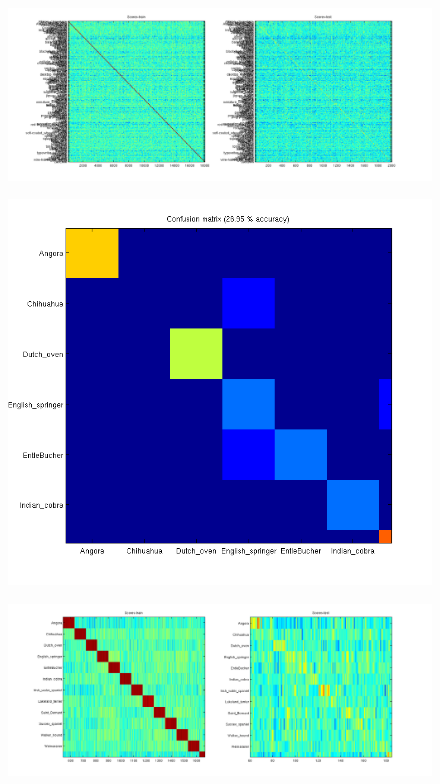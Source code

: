 \documentclass[10pt,two column,letter paper]{article}
\begin{document}
\begin{figure}[t]
\begin{center}
\includegraphics[width=0.9\linewidth]{m1-2_imagenet_tiny.png}
\end{center}
   \caption{}
\label{fig:m1-2_imagenet_tiny}
\end{figure}

\begin{figure}[t]
\begin{center}
\includegraphics[width=0.9\linewidth]{m1_imagenet_tiny_chihuahua-1.png}
\end{center}
   \caption{}
\label{fig:m1_imagenet_tiny_chihuahua_1}
\end{figure}

\begin{figure}[t]
\begin{center}
\includegraphics[width=0.9\linewidth]{m1_imagenet_tiny_chihuahua-2.png}
\end{center}
   \caption{}
\label{fig:m1_imagenet_tiny_chihuahua_2}
\end{figure}
\end{document}
